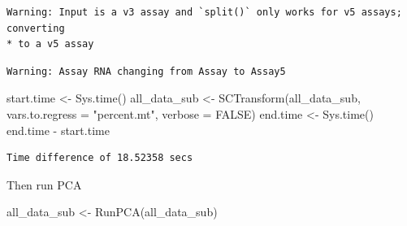 \documentclass[
  letterpaper,
  DIV=11,
  numbers=noendperiod]{scrreprt}
\newenvironment{Shaded}{\begin{snugshade}}{\end{snugshade}}
\newcommand{\AttributeTok}[1]{\textcolor[rgb]{0.40,0.45,0.13}{#1}}
\newcommand{\ConstantTok}[1]{\textcolor[rgb]{0.56,0.35,0.01}{#1}}
\newcommand{\FunctionTok}[1]{\textcolor[rgb]{0.28,0.35,0.67}{#1}}
\newcommand{\NormalTok}[1]{\textcolor[rgb]{0.00,0.23,0.31}{#1}}
\newcommand{\OtherTok}[1]{\textcolor[rgb]{0.00,0.23,0.31}{#1}}
\newcommand{\SpecialCharTok}[1]{\textcolor[rgb]{0.37,0.37,0.37}{#1}}
\newcommand{\StringTok}[1]{\textcolor[rgb]{0.13,0.47,0.30}{#1}}
\begin{document}
\begin{Shaded}
\end{Shaded}

\begin{verbatim}
Warning: Input is a v3 assay and `split()` only works for v5 assays; converting
* to a v5 assay
\end{verbatim}

\begin{verbatim}
Warning: Assay RNA changing from Assay to Assay5
\end{verbatim}

\begin{Shaded}
\begin{Highlighting}[]
\NormalTok{start.time }\OtherTok{\textless{}{-}} \FunctionTok{Sys.time}\NormalTok{()}
\NormalTok{all\_data\_sub }\OtherTok{\textless{}{-}} \FunctionTok{SCTransform}\NormalTok{(all\_data\_sub, }\AttributeTok{vars.to.regress =} \StringTok{"percent.mt"}\NormalTok{, }\AttributeTok{verbose =} \ConstantTok{FALSE}\NormalTok{)}
\NormalTok{end.time }\OtherTok{\textless{}{-}} \FunctionTok{Sys.time}\NormalTok{()}
\NormalTok{end.time }\SpecialCharTok{{-}}\NormalTok{ start.time}
\end{Highlighting}
\end{Shaded}

\begin{verbatim}
Time difference of 18.52358 secs
\end{verbatim}

Then run PCA

\begin{Shaded}
\begin{Highlighting}[]
\NormalTok{all\_data\_sub }\OtherTok{\textless{}{-}} \FunctionTok{RunPCA}\NormalTok{(all\_data\_sub)}
\end{Highlighting}
\end{Shaded}
\end{document}
